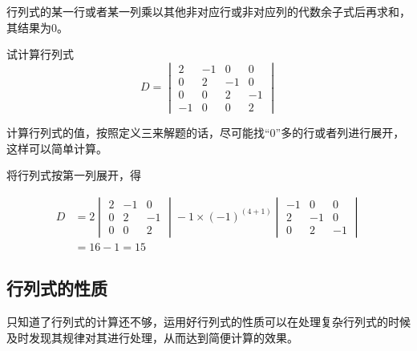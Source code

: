 \documentclass[12pt, a4paper, oneside, UTF8]{ctexbook}
\begin{document}
\begin{rmk}
    行列式的某一行或者某一列乘以其他非对应行或非对应列的代数余子式后再求和，其结果为$0$。
\end{rmk}
\begin{example}
    试计算行列式\[
        D=
        \begin{vmatrix}
            2&-1&0&0\\
            0&2&-1&0\\
            0&0&2&-1\\
            -1&0&0&2
        \end{vmatrix}
        \]
\end{example}
\begin{solution}
    计算行列式的值，按照定义三来解题的话，尽可能找“$0$”多的行或者列进行展开，这样可以简单计算。

    将行列式按第一列展开，得
    
    \[
         \begin{aligned}
            D&=2\begin{vmatrix}
                2&-1&0\\
                0&2&-1\\
                0&0&2
            \end{vmatrix}
            -1\times(-1)^{(4+1)}\begin{vmatrix}
                -1&0&0\\
                2&-1&0\\
                0&2&-1
            \end{vmatrix}\\
            &=16-1=15
         \end{aligned}
    \]
\end{solution}
\subsection{行列式的性质}
只知道了行列式的计算还不够，运用好行列式的性质可以在处理复杂行列式的时候及时发现其规律对其进行处理，从而达到简便计算的效果。
\end{document}
